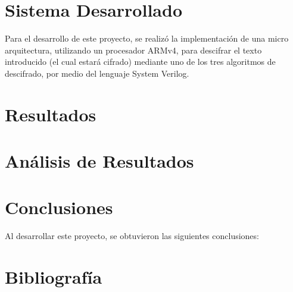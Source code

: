 \documentclass[journal,trans]{IEEEtran}
\begin{document}
	\section{Sistema Desarrollado}
	Para el desarrollo de este proyecto, se realizó la implementación de una micro arquitectura, utilizando un procesador ARMv4, para descifrar el texto introducido (el cual estará cifrado) mediante uno de los tres algoritmos de descifrado, por medio del lenguaje System Verilog.
	
	\section{Resultados}
	
	\section{Análisis de Resultados}
	
	\section{Conclusiones}
	Al desarrollar este proyecto, se obtuvieron las siguientes conclusiones:
	
	\section{Bibliografía}
	
	
	
	
\end{document}
